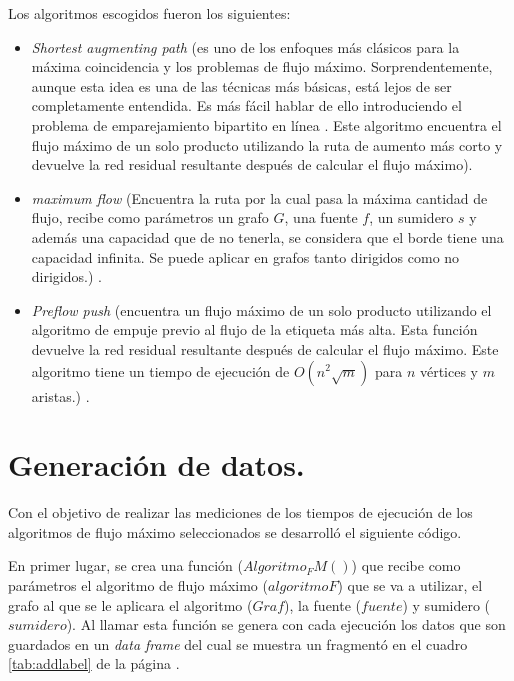 \documentclass{article}
\begin{document}
Los algoritmos escogidos fueron los siguientes:
\begin{itemize}
  \item\textit{Shortest augmenting path} (es uno de los enfoques más clásicos para la máxima coincidencia y los problemas de flujo máximo. Sorprendentemente, aunque esta idea es una de las técnicas más básicas, está lejos de ser completamente entendida. Es más fácil hablar de ello introduciendo el problema de emparejamiento bipartito en línea \cite{Bosek2018}. Este algoritmo encuentra el flujo máximo de un solo producto utilizando la ruta de aumento más corto y devuelve la red residual resultante después de calcular el flujo máximo).   
   \item\textit{maximum flow} (Encuentra la ruta por la cual pasa la máxima cantidad de flujo, recibe como parámetros un grafo $G$, una fuente $f$, un sumidero $s$ y además una capacidad que de no tenerla, se considera que el borde tiene una capacidad infinita. Se puede aplicar en grafos tanto dirigidos como no dirigidos.) \cite{mf}.
	\item\textit{Preflow push} (encuentra un flujo máximo de un solo producto utilizando el algoritmo de empuje previo al flujo de la etiqueta más alta. Esta función devuelve la red residual resultante después de calcular el flujo máximo. Este algoritmo tiene un tiempo de ejecución de $ O(n^{2}\sqrt{m})$ para $n$ vértices y $m$ aristas.) \cite{gc}.
\end{itemize}
\section{Generación de datos.}
Con el objetivo de realizar las mediciones de los tiempos de ejecución de los algoritmos de flujo máximo seleccionados se desarrolló el siguiente código.

En primer lugar, se crea una función ($Algoritmo_FM()$) que recibe como parámetros el algoritmo de flujo máximo ($algoritmoF$) que se va a utilizar, el grafo al que se le aplicara el algoritmo ($Graf$), la fuente ($fuente$) y sumidero ($sumidero$). Al llamar esta función se genera con cada ejecución los datos que son guardados en un \textit{data frame} del cual se muestra un fragmentó en el cuadro \ref{tab:addlabel} de la página \pageref{tab:addlabel}.

\begin{center}

\end{center}
\end{document}
